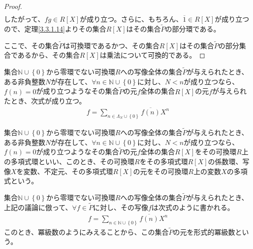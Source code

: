 \documentclass[dvipdfmx]{jsarticle}
\begin{document}
\begin{proof}
\begin{align*}
\end{align*}
したがって、$fg \in R[ X]$が成り立つ。さらに、もちろん、$\overline{1} \in R[ X]$が成り立つので、定理\ref{3.3.1.14}よりその集合$R[ X]$はその集合$\widetilde{P}$の部分環である。\par
ここで、その集合$\widetilde{P}$は可換環であるかつ、その集合$R[ X]$はその集合$\widetilde{P}$の部分集合であるから、その集合$R[ X]$は乗法について可換的である。
\end{proof}
\begin{thm}\label{3.3.3.5}
集合$\mathbb{N} \cup \left\{ 0 \right\}$から零環でない可換環$R$への写像全体の集合$\widetilde{P}$が与えられたとき、ある非負整数$N$が存在して、$\forall n \in \mathbb{N} \cup \left\{ 0 \right\}$に対し、$N < n$が成り立つなら、$f(n) = 0$が成り立つようなその集合$\widetilde{P}$の元$f$全体の集合$R[ X]$の元$f$が与えられたとき、次式が成り立つ。
\begin{align*}
f = \sum_{n \in \varLambda_{N} \cup \left\{ 0 \right\}} {\overline{f(n)}X^{n}}
\end{align*}
\end{thm}
\begin{dfn}
集合$\mathbb{N} \cup \left\{ 0 \right\}$から零環でない可換環$R$への写像全体の集合$\widetilde{P}$が与えられたとき、ある非負整数$N$が存在して、$\forall n \in \mathbb{N} \cup \left\{ 0 \right\}$に対し、$N < n$が成り立つなら、$f(n) = 0$が成り立つようなその集合$\widetilde{P}$の元$f$全体の集合$R[ X]$をその可換環$R$上の多項式環といい、このとき、その可換環$R$をその多項式環$R[ X]$の係数環、写像$X$を変数、不定元、その多項式環$R[ X]$の元をその可換環$R$上の変数$X$の多項式という。
\end{dfn}
\begin{dfn}
集合$\mathbb{N} \cup \left\{ 0 \right\}$から零環でない可換環$R$への写像全体の集合$\widetilde{P}$が与えられたとき、上記の議論に倣って、$\forall f \in \widetilde{P}$に対し、その写像$f$は次式のように書かれる。
\begin{align*}
f = \sum_{n \in \mathbb{N} \cup \left\{ 0 \right\}} {\overline{f(n)}X^{n}}
\end{align*}
このとき、冪級数のようにみえることから、この集合$\widetilde{P}$の元を形式的冪級数という。
\end{dfn}
\end{document}
